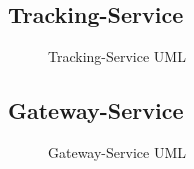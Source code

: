 \subsection{Tracking-Service}
\begin{figure}[!ht]
    \centering
    \caption{Tracking-Service UML}
    \label{fig:tracking-service}
\end{figure}

\subsection{Gateway-Service}
\begin{figure}[!ht]
    \centering
    \caption{Gateway-Service UML}
    \label{fig:gateway-service}
\end{figure}

